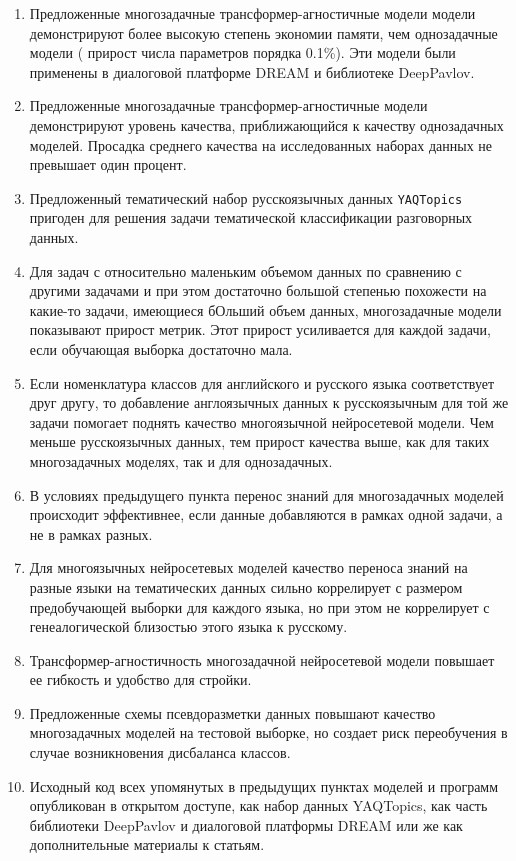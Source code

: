 \begin{enumerate}
\item Предложенные многозадачные трансформер-агностичные модели модели демонстрируют более высокую степень экономии памяти, чем однозадачные модели ( прирост числа параметров порядка 0.1\%). Эти модели были применены в диалоговой платформе DREAM и библиотеке DeepPavlov.
\item Предложенные многозадачные трансформер-агностичные модели демонстрируют уровень качества, приближающийся к качеству однозадачных моделей. Просадка среднего качества на исследованных наборах данных не превышает один процент.
\item Предложенный тематический набор русскоязычных данных \texttt{YAQTopics} пригоден для решения задачи тематической классификации разговорных данных.
\item Для задач с относительно маленьким объемом данных по сравнению с другими задачами и при этом достаточно большой степенью похожести на какие-то задачи, имеющиеся бОльший объем данных, многозадачные модели показывают прирост метрик. Этот прирост усиливается для каждой задачи, если обучающая выборка достаточно мала.
\item Если номенклатура классов для английского и русского языка соответствует друг другу, то добавление англоязычных данных к русскоязычным для той же задачи помогает поднять качество многоязычной нейросетевой модели. Чем меньше русскоязычных данных, тем прирост качества выше, как для таких многозадачных моделях, так и для однозадачных.
\item В условиях предыдущего пункта перенос знаний для многозадачных моделей происходит эффективнее, если данные добавляются в рамках одной задачи, а не в рамках разных.
\item Для многоязычных нейросетевых моделей качество переноса знаний на разные языки на тематических данных сильно коррелирует с размером предобучающей выборки для каждого языка, но при этом не коррелирует с генеалогической близостью этого языка к русскому.
\item Трансформер-агностичность многозадачной нейросетевой модели повышает ее гибкость и удобство для стройки.
\item Предложенные схемы псевдоразметки данных повышают качество многозадачных моделей на тестовой выборке, но создает риск переобучения в случае возникновения дисбаланса классов.
  \item Исходный код всех упомянутых в предыдущих пунктах моделей и программ опубликован в открытом доступе, как набор данных YAQTopics, как часть библиотеки DeepPavlov и диалоговой платформы DREAM или же как дополнительные материалы к статьям. 
\end{enumerate}
